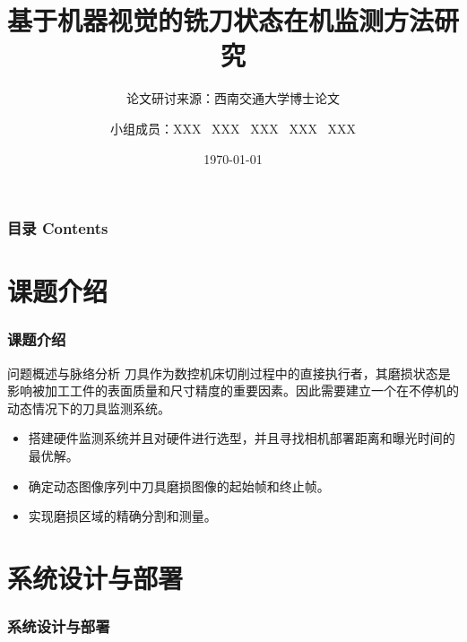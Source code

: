 \documentclass[aspectratio=169,t,xcolor=table,10pt]{ctexbeamer}
\title{\Huge{基于机器视觉的铣刀状态在机监测方法研究}}
\subtitle{论文研讨来源：西南交通大学博士论文}
\author{\large{小组成员：XXX \ XXX \ XXX \ XXX \ XXX}}
\institute{\large{仪器科学与光电工程学院 @ HFUT}}
\date{\today}
\numberwithin{equation}{section} %
\begin{document}
	
	\frame[noframenumbering]{\titlepage}
	
	
	\begin{frame}
		\frametitle{目录 Contents}
		\begin{center}
			\large{
				\tableofcontents[hideallsubsections]
			}
		\end{center}
	\end{frame}


	\section{课题介绍}
	\begin{frame}
		\frametitle{课题介绍}
	\end{frame}

	\begin{frame}
		\begin{block}{问题概述与脉络分析}
			\qquad 刀具作为数控机床切削过程中的直接执行者，其磨损状态是影响被加工工件的表面质量和尺寸精度的重要因素。因此需要建立一个在不停机的动态情况下的刀具监测系统。
			\begin{itemize}
				\item 搭建硬件监测系统并且对硬件进行选型，并且寻找相机部署距离和曝光时间的最优解。
				\item 确定动态图像序列中刀具磨损图像的起始帧和终止帧。
				\item 实现磨损区域的精确分割和测量。
			\end{itemize}
		\end{block}
	\end{frame}
	

	\section{系统设计与部署}
	\begin{frame}
		\frametitle{系统设计与部署}
	\end{frame}
	
\end{document}

